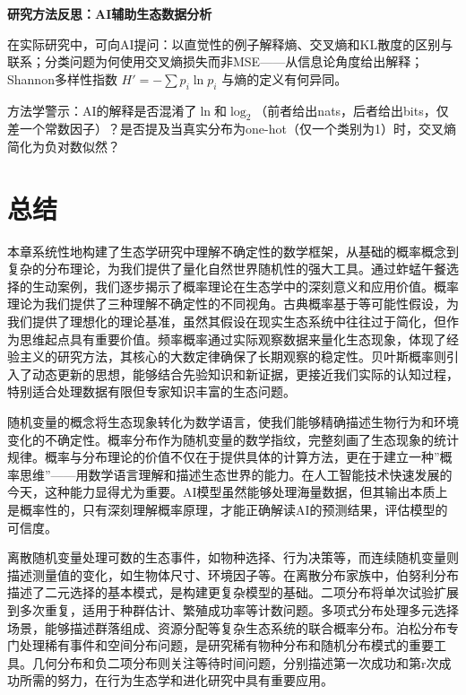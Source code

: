 \documentclass[
  twoside,12pt,fontset=none]{ctexbook}
\renewenvironment{quote}{%
  \def\FrameCommand{{\color{quote-border}\vrule width 4pt}\hspace{10pt}}%
  \MakeFramed {\advance\hsize-\width \FrameRestore\noindent\ignorespaces}%
}{%
  \endMakeFramed
}
\begin{document}
\begin{quote}
\textbf{研究方法反思：AI辅助生态数据分析}

在实际研究中，可向AI提问：以直觉性的例子解释熵、交叉熵和KL散度的区别与联系；分类问题为何使用交叉熵损失而非MSE------从信息论角度给出解释；Shannon多样性指数 \(H' = -\sum p_i \ln p_i\) 与熵的定义有何异同。

方法学警示：AI的解释是否混淆了\(\ln\)和\(\log_2\)（前者给出nats，后者给出bits，仅差一个常数因子）？是否提及当真实分布为one-hot（仅一个类别为1）时，交叉熵简化为负对数似然？
\end{quote}

\hypertarget{ux603bux7ed3-2}{%
\section{总结}\label{ux603bux7ed3-2}}

本章系统性地构建了生态学研究中理解不确定性的数学框架，从基础的概率概念到复杂的分布理论，为我们提供了量化自然世界随机性的强大工具。通过蚱蜢午餐选择的生动案例，我们逐步揭示了概率理论在生态学中的深刻意义和应用价值。概率理论为我们提供了三种理解不确定性的不同视角。古典概率基于等可能性假设，为我们提供了理想化的理论基准，虽然其假设在现实生态系统中往往过于简化，但作为思维起点具有重要价值。频率概率通过实际观察数据来量化生态现象，体现了经验主义的研究方法，其核心的大数定律确保了长期观察的稳定性。贝叶斯概率则引入了动态更新的思想，能够结合先验知识和新证据，更接近我们实际的认知过程，特别适合处理数据有限但专家知识丰富的生态问题。

随机变量的概念将生态现象转化为数学语言，使我们能够精确描述生物行为和环境变化的不确定性。概率分布作为随机变量的数学指纹，完整刻画了生态现象的统计规律。概率与分布理论的价值不仅在于提供具体的计算方法，更在于建立一种''概率思维''------用数学语言理解和描述生态世界的能力。在人工智能技术快速发展的今天，这种能力显得尤为重要。AI模型虽然能够处理海量数据，但其输出本质上是概率性的，只有深刻理解概率原理，才能正确解读AI的预测结果，评估模型的可信度。

离散随机变量处理可数的生态事件，如物种选择、行为决策等，而连续随机变量则描述测量值的变化，如生物体尺寸、环境因子等。在离散分布家族中，伯努利分布描述了二元选择的基本模式，是构建更复杂模型的基础。二项分布将单次试验扩展到多次重复，适用于种群估计、繁殖成功率等计数问题。多项式分布处理多元选择场景，能够描述群落组成、资源分配等复杂生态系统的联合概率分布。泊松分布专门处理稀有事件和空间分布问题，是研究稀有物种分布和随机分布模式的重要工具。几何分布和负二项分布则关注等待时间问题，分别描述第一次成功和第r次成功所需的努力，在行为生态学和进化研究中具有重要应用。
\end{document}
